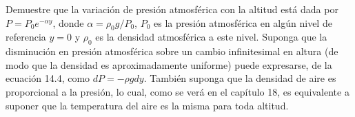 \item Demuestre que la variación de presión atmosférica con la altitud está dada por $P = P_0 e^{-\alpha y}$, donde $\alpha = \rho_0 g / P_0$, $P_0$ es la presión atmosférica en algún nivel de referencia $y = 0$ y $\rho_0$ es la densidad atmosférica a este nivel. Suponga que la disminución en presión atmosférica sobre un cambio infinitesimal en altura (de modo que la densidad es aproximadamente uniforme) puede expresarse, de la ecuación 14.4, como $dP = -\rho g dy$. También suponga que la densidad de aire es proporcional a la presión, lo cual, como se verá en el capítulo 18, es equivalente a suponer que la temperatura del aire es la misma para toda altitud.
